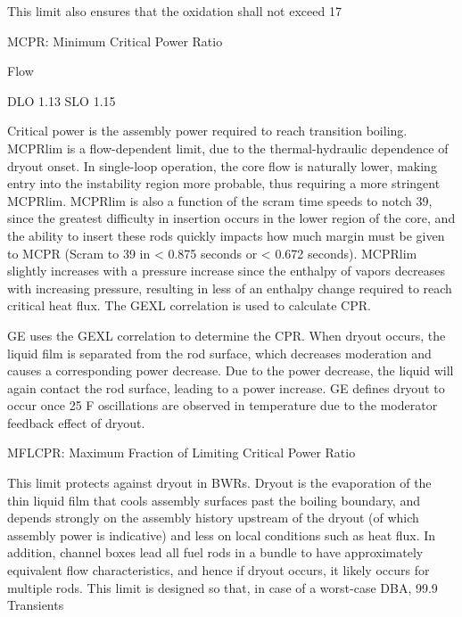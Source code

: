\documentclass[10pt]{article}
\begin{document}
This limit also ensures that the oxidation shall not exceed 17%

MCPR: Minimum Critical Power Ratio



Flow 

DLO
1.13
SLO
1.15

Critical power is the assembly power required to reach transition boiling. MCPRlim is a flow-dependent limit, due to the thermal-hydraulic dependence of dryout onset. In single-loop operation, the core flow is naturally lower, making entry into the instability region more probable, thus requiring a more stringent MCPRlim. MCPRlim is also a function of the scram time speeds to notch 39, since the greatest difficulty in insertion occurs in the lower region of the core, and the ability to insert these rods quickly impacts how much margin must be given to MCPR (Scram to 39 in < 0.875 seconds or < 0.672 seconds). MCPRlim slightly increases with a pressure increase since the enthalpy of vapors decreases with increasing pressure, resulting in less of an enthalpy change required to reach critical heat flux. The GEXL correlation is used to calculate CPR. 

GE uses the GEXL correlation to determine the CPR. When dryout occurs, the liquid film is separated from the rod surface, which decreases moderation and causes a corresponding power decrease. Due to the power decrease, the liquid will again contact the rod surface, leading to a power increase. GE defines dryout to occur once 25 F oscillations are observed in temperature due to the moderator feedback effect of dryout. 

MFLCPR: Maximum Fraction of Limiting Critical Power Ratio



This limit protects against dryout in BWRs. Dryout is the evaporation of the thin liquid film that cools assembly surfaces past the boiling boundary, and depends strongly on the assembly history upstream of the dryout (of which assembly power is indicative) and less on local conditions such as heat flux. In addition, channel boxes lead all fuel rods in a bundle to have approximately equivalent flow characteristics, and hence if dryout occurs, it likely occurs for multiple rods. This limit is designed so that, in case of a worst-case DBA, 99.9%

Transients
\end{document}
